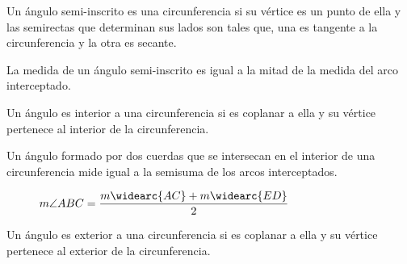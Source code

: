 \begin{definition}
    Un ángulo semi-inscrito es una circunferencia si su vértice es un punto de ella y las semirectas que determinan sus lados son tales que, una es tangente a la circunferencia y la otra es secante.
\end{definition}

\begin{theorem}
    La medida de un ángulo semi-inscrito es igual a la mitad de la medida del arco interceptado.

    \begin{figure}[!h]
        \centering
        
        \label{fig:semi-inscrito-mitad-interceptado}
    \end{figure}
    
\end{theorem}

\clearpage

\begin{definition}
    Un ángulo es interior a una circunferencia si es coplanar a ella y su vértice pertenece al interior de la circunferencia.
\end{definition}

\begin{theorem}
    Un ángulo formado por dos cuerdas que se intersecan en el interior de una circunferencia mide igual a la semisuma de los arcos interceptados.

    \begin{figure}[!h]
        \centering
        
        \caption{$m\angle{ABC} = \dfrac{m\widearc{AC} + m\widearc{ED}}{2}$}
        \label{fig:ang-entre-dos-cuerdas}
    \end{figure}
    
\end{theorem}

\clearpage

\begin{definition}
    Un ángulo es exterior a una circunferencia si es coplanar a ella y su vértice pertenece al exterior de la circunferencia.
\end{definition}

